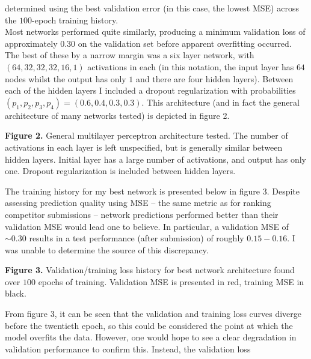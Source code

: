 \documentclass[11pt]{article}
\newcommand{\1}[1]{\mathbbm{1}_{#1}}
\begin{document}
determined using the best validation error (in this case, the lowest MSE) across the $100$-epoch training history.\\[5pt]
Most networks performed quite similarly, producing a minimum validation loss of approximately $0.30$ on the validation set before apparent overfitting occurred. The best of these by a narrow margin
was a six layer network, with $(64,32,32,32,16,1)$ activations in each (in this notation, the input layer has $64$ nodes whilst the output has only $1$ and there are four hidden layers). Between each of the hidden layers I included a dropout regularization with probabilities $(p_1,p_2,p_3,p_4)=(0.6,0.4,0.3,0.3)$.
This architecture (and in fact the general architecture of many networks tested) is depicted in figure 2.
\begin{center}
\end{center}
\begin{center}
    \begin{minipage}{\dimexpr\paperwidth-5cm}
        {\bf Figure 2.} General multilayer perceptron architecture tested. The number of activations in each layer is left unspecified, but is generally similar between hidden layers. Initial layer has a large number of activations, and output has only one. Dropout regularization is included between hidden layers.
    \end{minipage}
\end{center}
The training history for my best network is presented below in figure 3. Despite assessing prediction quality using MSE -- the same metric as for ranking competitor submissions -- network predictions performed better than their validation MSE would lead one to believe. In particular, a validation MSE of $\sim 0.30$ results in a test performance (after submission) of roughly $0.15-0.16$.
I was unable to determine the source of this discrepancy. 
\begin{center}
\end{center}
\begin{center}
    \begin{minipage}{\dimexpr\paperwidth-5cm}
        {\bf Figure 3.} Validation/training loss history for best network architecture found over $100$ epochs of training. Validation MSE is presented in red, training MSE in black. 
    \end{minipage}
\end{center}
From figure 3, it can be seen that the validation and training loss curves diverge before the twentieth epoch, so this could be considered the point at which the model overfits the data. However, one would hope to see a clear degradation in validation performance to confirm this. Instead, the validation loss
\end{document}
